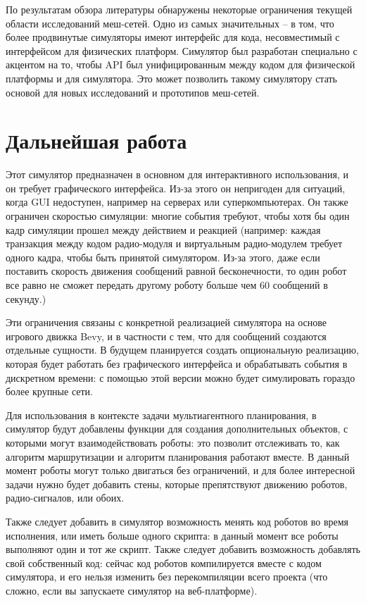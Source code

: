 \documentclass[%
]{report}
\begin{document}
По результатам обзора литературы обнаружены
некоторые ограничения текущей области исследований меш-сетей.
Одно из самых значительных --
в том, что более продвинутые симуляторы имеют интерфейс для кода,
несовместимый с интерфейсом для физических платформ.
Симулятор был разработан специально с акцентом на то,
чтобы API был унифицированным между кодом для физической платформы и для симулятора.
Это может позволить такому симулятору
стать основой для новых исследований
и прототипов меш-сетей.



\section*{Дальнейшая работа}

Этот симулятор предназначен в основном для интерактивного использования,
и он требует графического интерфейса.
Из-за этого он непригоден для ситуаций, когда GUI недоступен,
например на серверах или суперкомпьютерах.
Он также ограничен скоростью симуляции:
многие события требуют, чтобы хотя бы один кадр симуляции прошел
между действием и реакцией
(например: каждая транзакция между кодом радио-модуля
и виртуальным радио-модулем
требует одного кадра,
чтобы быть принятой симулятором.
Из-за этого,
даже если поставить скорость движения сообщений равной бесконечности,
то один робот все равно не сможет передать другому роботу
больше чем 60 сообщений в секунду.)

Эти ограничения связаны с конкретной реализацией симулятора
на основе игрового движка Bevy,
и в частности с тем, что для сообщений создаются отдельные сущности.
В будущем планируется создать опциональную реализацию,
которая будет работать без графического интерфейса
и обрабатывать события в дискретном времени:
с помощью этой версии можно будет симулировать гораздо более крупные сети.

Для использования в контексте задачи
мультиагентного планирования,
в симулятор будут добавлены
функции для создания дополнительных объектов,
с которыми могут взаимодействовать роботы:
это позволит отслеживать то,
как алгоритм маршрутизации и алгоритм планирования работают вместе.
В данный момент роботы могут только двигаться без ограничений,
и для более интересной задачи нужно будет добавить стены, которые препятствуют движению роботов,
радио-сигналов, или обоих.

Также следует добавить в симулятор
возможность менять код роботов во время исполнения, или
иметь больше одного скрипта:
в данный момент все роботы выполняют один и тот же скрипт.
Также следует добавить возможность добавлять свой собственный код:
сейчас код роботов компилируется вместе с кодом симулятора,
и его нельзя изменить без перекомпиляции всего проекта
(что сложно, если вы запускаете симулятор на веб-платформе).
\end{document}
